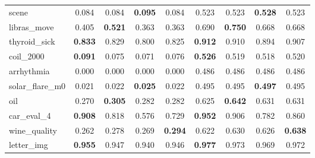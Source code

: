 \begin{figure}[ht]
\begin{tabular}{p{22mm}|*4{p{14mm}}|*4{p{14mm}}}
        scene&\multicolumn{1}{c}{0.084}&\multicolumn{1}{c}{0.084}&\multicolumn{1}{c}{\textbf{0.095}}&\multicolumn{1}{c|}{0.084}&\multicolumn{1}{c}{0.523}&\multicolumn{1}{c}{0.523}&\multicolumn{1}{c}{\textbf{0.528}}&\multicolumn{1}{c}{0.523}\\
        libras\_move&\multicolumn{1}{c}{0.405}&\multicolumn{1}{c}{\textbf{0.521}}&\multicolumn{1}{c}{0.363}&\multicolumn{1}{c|}{0.363}&\multicolumn{1}{c}{0.690}&\multicolumn{1}{c}{\textbf{0.750}}&\multicolumn{1}{c}{0.668}&\multicolumn{1}{c}{0.668}\\
        thyroid\_sick&\multicolumn{1}{c}{\textbf{0.833}}&\multicolumn{1}{c}{0.829}&\multicolumn{1}{c}{0.800}&\multicolumn{1}{c|}{0.825}&\multicolumn{1}{c}{\textbf{0.912}}&\multicolumn{1}{c}{0.910}&\multicolumn{1}{c}{0.894}&\multicolumn{1}{c}{0.907}\\
        coil\_2000&\multicolumn{1}{c}{\textbf{0.091}}&\multicolumn{1}{c}{0.075}&\multicolumn{1}{c}{0.071}&\multicolumn{1}{c|}{0.076}&\multicolumn{1}{c}{\textbf{0.526}}&\multicolumn{1}{c}{0.519}&\multicolumn{1}{c}{0.518}&\multicolumn{1}{c}{0.520}\\
        arrhythmia&\multicolumn{1}{c}{0.000}&\multicolumn{1}{c}{0.000}&\multicolumn{1}{c}{0.000}&\multicolumn{1}{c|}{0.000}&\multicolumn{1}{c}{0.486}&\multicolumn{1}{c}{0.486}&\multicolumn{1}{c}{0.486}&\multicolumn{1}{c}{0.486}\\
        solar\_flare\_m0&\multicolumn{1}{c}{0.021}&\multicolumn{1}{c}{0.022}&\multicolumn{1}{c}{\textbf{0.025}}&\multicolumn{1}{c|}{0.022}&\multicolumn{1}{c}{0.495}&\multicolumn{1}{c}{0.495}&\multicolumn{1}{c}{\textbf{0.497}}&\multicolumn{1}{c}{0.495}\\
        oil&\multicolumn{1}{c}{0.270}&\multicolumn{1}{c}{\textbf{0.305}}&\multicolumn{1}{c}{0.282}&\multicolumn{1}{c|}{0.282}&\multicolumn{1}{c}{0.625}&\multicolumn{1}{c}{\textbf{0.642}}&\multicolumn{1}{c}{0.631}&\multicolumn{1}{c}{0.631}\\
        car\_eval\_4&\multicolumn{1}{c}{\textbf{0.908}}&\multicolumn{1}{c}{0.818}&\multicolumn{1}{c}{0.576}&\multicolumn{1}{c|}{0.729}&\multicolumn{1}{c}{\textbf{0.952}}&\multicolumn{1}{c}{0.906}&\multicolumn{1}{c}{0.782}&\multicolumn{1}{c}{0.860}\\
        wine\_quality&\multicolumn{1}{c}{0.262}&\multicolumn{1}{c}{0.278}&\multicolumn{1}{c}{0.269}&\multicolumn{1}{c|}{\textbf{0.294}}&\multicolumn{1}{c}{0.622}&\multicolumn{1}{c}{0.630}&\multicolumn{1}{c}{0.626}&\multicolumn{1}{c}{\textbf{0.638}}\\
        letter\_img&\multicolumn{1}{c}{\textbf{0.955}}&\multicolumn{1}{c}{0.947}&\multicolumn{1}{c}{0.940}&\multicolumn{1}{c|}{0.946}&\multicolumn{1}{c}{\textbf{0.977}}&\multicolumn{1}{c}{0.973}&\multicolumn{1}{c}{0.969}&\multicolumn{1}{c}{0.972}\\

\end{tabular}
\end{figure}
